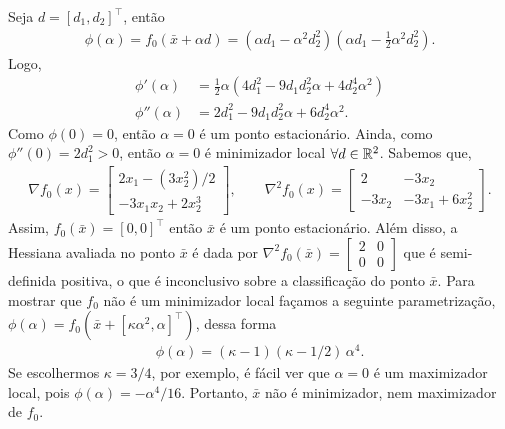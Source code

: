 \begin{questions}
\begin{solution}
	Seja $d=[d_1,d_2]^\top $, então
    \begin{align*}
    	\phi(\alpha) = f_0(\bar{x}+\alpha d) = (\alpha d_1-\alpha^2d_2^2)\left(\alpha d_1 - \frac{1}{2} \alpha^2d_2^2\right).
    \end{align*}
    Logo,
    \begin{align*}
    	\phi'(\alpha) &= \frac{1}{2} \alpha (4 d_1^2 - 9 d_1 d_2^2 \alpha + 4 d_2^4 \alpha^2)\\
        \phi''(\alpha) &= 2 d_1^2 - 9 d_1 d_2^2 \alpha + 6 d_2^4 \alpha^2.
    \end{align*}
    Como $\phi(0) = 0$, então $\alpha = 0$ é um ponto estacionário. Ainda, como $\phi''(0) = 2 d_1^2 > 0$, então $\alpha = 0$ é minimizador local $\forall d\in{\mathbb R}^2$.
    Sabemos que,
    \begin{align*}
    \nabla f_0(x) = 
        \begin{bmatrix}
    		2 x_1 - (3 x_2^2)/2 \\
    		-3 x_1 x_2 + 2 x_2^3
		\end{bmatrix},\qquad
    \nabla^2 f_0(x) = 
        \begin{bmatrix}
    		2 & -3 x_2 \\
    		-3 x_2 & -3 x_1 + 6 x_2^2
		\end{bmatrix}.
    \end{align*}
	Assim, $f_0(\bar{x}) = [0,0]^\top $ então $\bar{x}$ é um ponto estacionário. Além disso, a Hessiana avaliada no ponto $\bar{x}$ é dada por 
    $
    \nabla^2 f_0(\bar{x}) = 
        \begin{bmatrix}
    		2 & 0 \\
    		0 & 0
		\end{bmatrix}
    $
    que é semi-definida positiva, o que é inconclusivo sobre a classificação do ponto $\bar{x}$. Para mostrar que $f_0$ não é um minimizador local façamos a seguinte parametrização, $\phi(\alpha) = f_0(\bar{x}+[\kappa \alpha^2,\alpha]^\top )$, dessa forma
    \begin{align*}
    	\phi(\alpha) = (\kappa-1)(\kappa-1/2)\,\alpha^4.
    \end{align*}
    Se escolhermos $\kappa=3/4$, por exemplo, é fácil ver que $\alpha=0$ é um maximizador local, pois $\phi(\alpha)=-\alpha^4/16$. Portanto, $\bar{x}$ não é minimizador, nem maximizador de $f_0$.
\end{solution}


\end{questions}
